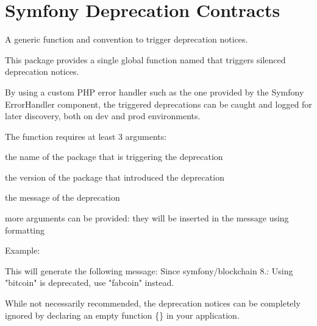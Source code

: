 \chapter{Symfony Deprecation Contracts}
\hypertarget{md_public_2glpi_2vendor_2symfony_2deprecation-contracts_2_r_e_a_d_m_e}{}\label{md_public_2glpi_2vendor_2symfony_2deprecation-contracts_2_r_e_a_d_m_e}
A generic function and convention to trigger deprecation notices.

This package provides a single global function named {\ttfamily {}} that triggers silenced deprecation notices.

By using a custom PHP error handler such as the one provided by the Symfony Error\+Handler component, the triggered deprecations can be caught and logged for later discovery, both on dev and prod environments.

The function requires at least 3 arguments\+:
\begin{DoxyItemize}
\item the name of the  package that is triggering the deprecation
\item the version of the package that introduced the deprecation
\item the message of the deprecation
\item more arguments can be provided\+: they will be inserted in the message using {\ttfamily {}} formatting
\end{DoxyItemize}

Example\+: 
\begin{DoxyCode}{0}

\end{DoxyCode}


This will generate the following message\+: {\ttfamily Since symfony/blockchain 8.\+: Using "{}bitcoin"{} is deprecated, use "{}fabcoin"{} instead.}

While not necessarily recommended, the deprecation notices can be completely ignored by declaring an empty {\ttfamily function  \{\}} in your application. 